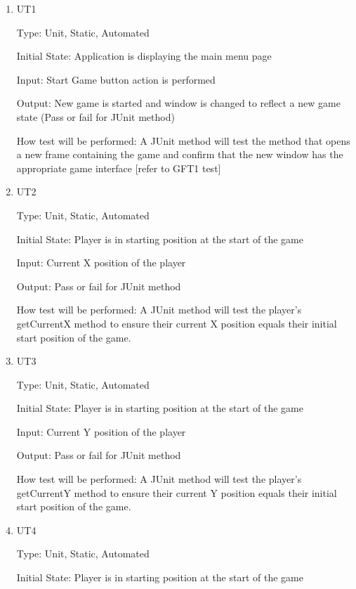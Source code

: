 \documentclass[12pt, titlepage]{article}
\begin{document}
\begin{enumerate}

\item{UT1\\}

Type: Unit, Static, Automated
					
Initial State: Application is displaying the main menu page
					
Input: Start Game button action is performed
					
Output: New game is started and window is changed to reflect a new game state (Pass or fail for JUnit method)
					
How test will be performed: A JUnit method will test the method that opens a new frame containing the game and confirm that the new window has the appropriate game interface [refer to GFT1 test]

\item{UT2\\}

Type: Unit, Static, Automated
					
Initial State: Player is in starting position at the start of the game
					
Input: Current X position of the player
					
Output: Pass or fail for JUnit method
					
How test will be performed: A JUnit method will test the player's getCurrentX method to ensure their current X position equals their initial start position of the game.

\item{UT3\\}

Type: Unit, Static, Automated
					
Initial State: Player is in starting position at the start of the game
					
Input: Current Y position of the player
					
Output: Pass or fail for JUnit method
					
How test will be performed: A JUnit method will test the player's getCurrentY method to ensure their current Y position equals their initial start position of the game.

\item{UT4\\}

Type: Unit, Static, Automated
					
Initial State: Player is in starting position at the start of the game
					

\end{enumerate}
\end{document}
